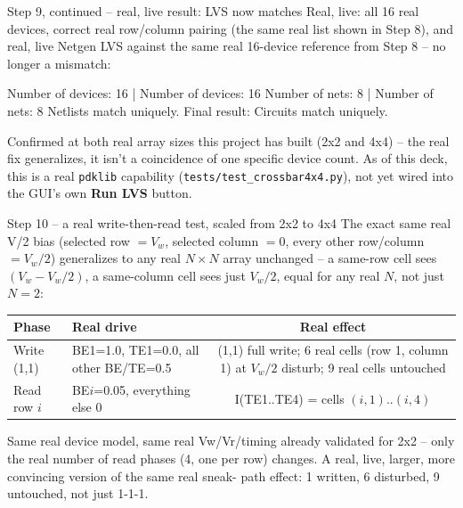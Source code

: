 \documentclass[aspectratio=169,9pt]{beamer}
\begin{document}
\begin{frame}[fragile]{Step 9, continued -- real, live result: LVS now matches}
Real, live: all 16 real devices, correct real row/column pairing (the
same real list shown in Step 8), and real, live Netgen LVS against the
same real 16-device reference from Step 8 -- no longer a mismatch:
\begin{cli}
Number of devices: 16               | Number of devices: 16
Number of nets: 8                   | Number of nets: 8
Netlists match uniquely.
Final result: Circuits match uniquely.
\end{cli}
\footnotesize
Confirmed at both real array sizes this project has built (2x2 and
4x4) -- the real fix generalizes, it isn't a coincidence of one
specific device count. As of this deck, this is a real
\texttt{pdklib} capability (\texttt{tests/test\_crossbar4x4.py}), not
yet wired into the GUI's own \textbf{Run LVS} button.
\end{frame}

\begin{frame}[fragile]{Step 10 -- a real write-then-read test, scaled from 2x2 to 4x4}
The exact same real V/2 bias (selected row $=V_w$, selected column
$=0$, every other row/column $=V_w/2$) generalizes to any real
$N{\times}N$ array unchanged -- a same-row cell sees $(V_w - V_w/2)$,
a same-column cell sees just $V_w/2$, equal for any real $N$, not
just $N{=}2$:
\begin{center}
\begin{tabularx}{\textwidth}{lXc}
\toprule
Phase & Real drive & Real effect \\
\midrule
Write (1,1) & BE1=1.0, TE1=0.0, all other BE/TE=0.5 & (1,1) full write; 6 real cells (row 1, column 1) at $V_w/2$ disturb; 9 real cells untouched \\
Read row $i$ & BE$i$=0.05, everything else 0 & I(TE1..TE4) = cells $(i,1)..(i,4)$ \\
\bottomrule
\end{tabularx}
\end{center}
\footnotesize
Same real device model, same real Vw/Vr/timing already validated for
2x2 -- only the real number of read phases (4, one per row) changes.
A real, live, larger, more convincing version of the same real sneak-
path effect: 1 written, 6 disturbed, 9 untouched, not just 1-1-1.
\end{frame}
\end{document}
